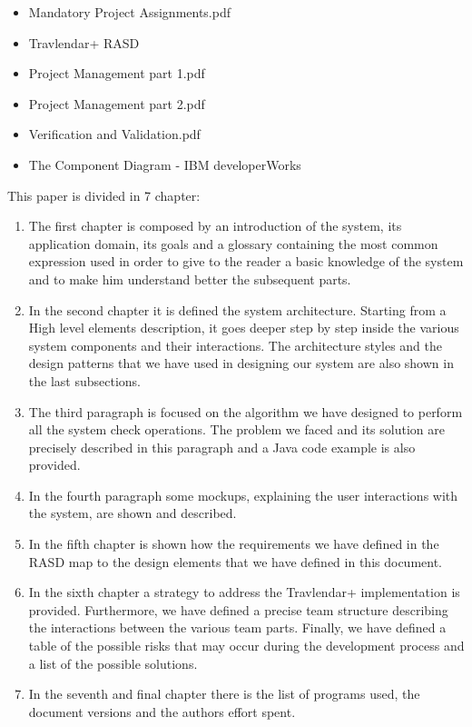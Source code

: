 \begin{itemize}
	\setlength{\leftskip}{0.5cm}
	\item Mandatory Project Assignments.pdf
	\item Travlendar+ RASD
	\item Project Management part 1.pdf
	\item Project Management part 2.pdf
	\item Verification and Validation.pdf
	\item The Component Diagram - IBM developerWorks
\end{itemize}

This paper is divided in 7 chapter:
\begin{enumerate}
	\setlength{\leftskip}{0.5cm}
	\item The first chapter is composed by an introduction of the system, its application domain, its goals and a glossary containing the most common expression used in order to give to the reader a basic knowledge of the system and to make him understand better the subsequent parts.
	
	\item In the second chapter it is defined the system architecture. Starting from a High level elements description, it goes deeper step by step inside the various system components and their interactions. The architecture styles and the design patterns that we have used in designing our system are also shown in the last subsections.
	
	\item The third paragraph is focused on the algorithm we have designed to perform all the system check operations. The problem we faced and its solution are precisely described in this paragraph and a Java code example is also provided.
	
	\item In the fourth paragraph some mockups, explaining the user interactions with the system, are shown and described.
	
	\item In the fifth chapter is shown how the requirements we have defined in the RASD map to the design elements that we have defined in this document.
	
	\item In the sixth chapter a strategy to address the Travlendar+ implementation is provided. Furthermore, we have defined a precise team structure describing the interactions between the various team parts. Finally, we have defined a table of the possible risks that may occur during the development process and a list of the possible solutions.
	
	\item In the seventh and final chapter there is the list of programs used, the document versions and the authors effort spent.
\end{enumerate}
